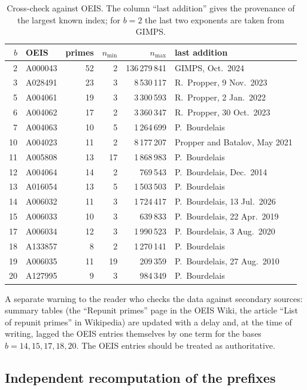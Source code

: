 \documentclass[11pt,a4paper]{article}
\theoremstyle{plain}
\theoremstyle{remark}
\begin{document}
\begin{table}[h]
\centering
\caption{Cross-check against OEIS. The column ``last addition'' gives the
provenance of the largest known index; for $b=2$ the last two exponents are taken
from GIMPS.}
\label{tab:verify}
\small
\begin{tabular}{rlrrrl}
\toprule
$b$ & OEIS & primes & $n_{\min}$ & $n_{\max}$ & last addition\\
\midrule
2 & A000043 & 52 & 2 & 136\,279\,841 & GIMPS, Oct.\ 2024\\
3 & A028491 & 23 & 3 & 8\,530\,117 & R.~Propper, 9 Nov.\ 2023\\
5 & A004061 & 19 & 3 & 3\,300\,593 & R.~Propper, 2 Jan.\ 2022\\
6 & A004062 & 17 & 2 & 3\,360\,347 & R.~Propper, 30 Oct.\ 2023\\
7 & A004063 & 10 & 5 & 1\,264\,699 & P.~Bourdelais\\
10 & A004023 & 11 & 2 & 8\,177\,207 & Propper and Batalov, May 2021\\
11 & A005808 & 13 & 17 & 1\,868\,983 & P.~Bourdelais\\
12 & A004064 & 14 & 2 & 769\,543 & P.~Bourdelais, Dec.\ 2014\\
13 & A016054 & 13 & 5 & 1\,503\,503 & P.~Bourdelais\\
14 & A006032 & 11 & 3 & 1\,724\,417 & P.~Bourdelais, 13 Jul.\ 2026\\
15 & A006033 & 10 & 3 & 639\,833 & P.~Bourdelais, 22 Apr.\ 2019\\
17 & A006034 & 12 & 3 & 1\,990\,523 & P.~Bourdelais, 3 Aug.\ 2020\\
18 & A133857 & 8 & 2 & 1\,270\,141 & P.~Bourdelais\\
19 & A006035 & 11 & 19 & 209\,359 & P.~Bourdelais, 27 Aug.\ 2010\\
20 & A127995 & 9 & 3 & 984\,349 & P.~Bourdelais\\
\bottomrule
\end{tabular}
\end{table}

A separate warning to the reader who checks the data against secondary sources:
summary tables (the ``Repunit primes'' page in the OEIS Wiki, the article ``List
of repunit primes'' in Wikipedia) are updated with a delay and, at the time of
writing, lagged the OEIS entries themselves by one term for the bases
$b=14,15,17,18,20$. The OEIS entries should be treated as authoritative.

\subsection*{Independent recomputation of the prefixes}
\end{document}
